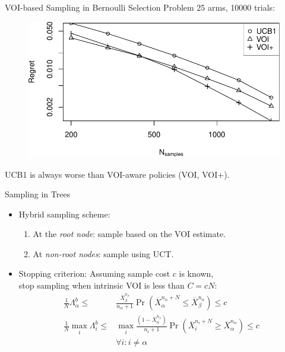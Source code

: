 \documentclass{beamer}
\begin{document}
\begin{frame}{VOI-based Sampling in Bernoulli Selection Problem}
25 arms, 10000 trials:
\begin{figure}[h]
\centering
\includegraphics[scale=0.65]{flat.pdf}
\end{figure}
UCB1 is always worse than VOI-aware policies (VOI, VOI+).
\end{frame}

\begin{frame}{Sampling in Trees}
\begin{itemize}
\item Hybrid sampling scheme:
\begin{enumerate}
\item At the {\it root node}: sample based on the VOI estimate.
\item At {\it non-root nodes}: sample using UCT.
\end{enumerate}
\item Stopping criterion: Assuming sample cost $c$ is known,\\
\hspace{1em}stop sampling when intrinsic VOI is less than $C=cN$:
\begin{align*}
\frac 1 N \Lambda_\alpha^b \le&\frac {\overline X_\beta^{n_\beta}}
  {n_\alpha+1}\Pr(\overline X_\alpha^{n_\alpha+N}\le\overline
  X_\beta^{n_\alpha})\le c\\
\frac 1 N \max_i\Lambda_i^b\le &\max_i\frac {(1-\overline X_\alpha^{n_\alpha})} {n_i+1}\Pr(\overline
  X_i^{n_i+N}\ge\overline X_\alpha^{n_\alpha})\le c\\
    &\forall i: i\ne\alpha
\end{align*}
\end{itemize}
\end{frame}
\end{document}

